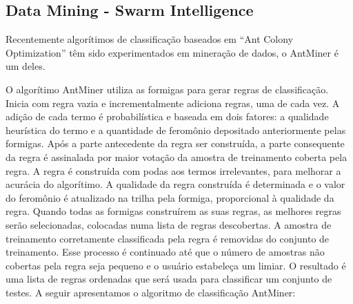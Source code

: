\subsection{Data Mining - Swarm Intelligence}\label{arte:palavraChave:Swarm}

Recentemente algorítimos de classificação baseados em ``Ant Colony Optimization'' têm sido experimentados em mineração de dados\cite{Baig2012}, o AntMiner é um deles.

O algorítimo AntMiner utiliza as formigas para gerar regras de classificação. Inicia com regra vazia e incrementalmente adiciona regras, uma de cada vez. 
A adição de cada termo é probabilística e baseada em dois fatores: a qualidade heurística do termo e a quantidade de feromônio depositado anteriormente pelas formigas. 
Após a parte antecedente da regra ser construída, a parte consequente da regra é assinalada por maior votação da amostra de treinamento coberta pela regra. 
A regra é construída com podas aos termos irrelevantes, para melhorar a acurácia do algorítimo. A qualidade da regra construída é determinada e o valor do feromônio é 
atualizado na trilha pela formiga, proporcional à qualidade da regra. Quando todas as formigas construírem as suas regras, as melhores regras serão selecionadas, 
colocadas numa lista de regras descobertas. A amostra de treinamento corretamente classificada pela regra é removidas do conjunto de treinamento. 
Esse processo é continuado até que o número de amostras não cobertas pela regra seja pequeno e o usuário estabeleça um limiar. 
O resultado é uma lista de regras ordenadas que será usada para classificar um conjunto de testes. A seguir apresentamos o algoritmo de classificação AntMiner:

\vspace{0.3cm}

